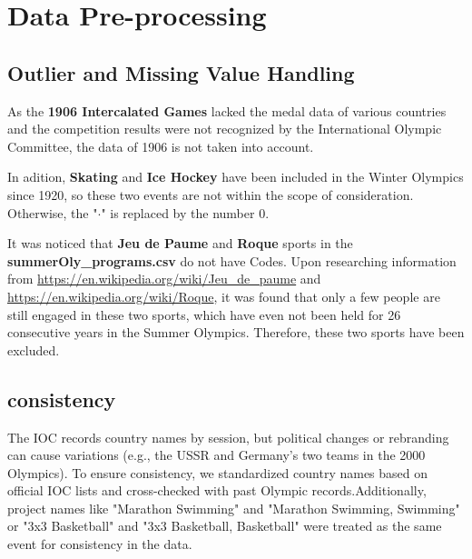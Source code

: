\documentclass{mcmthesis}
\begin{document}
\section{Data Pre-processing}

\subsection{Outlier and Missing Value Handling}
As the \textbf{1906 Intercalated Games} lacked the medal data of various countries and the competition results were not recognized by the International Olympic Committee, the data of 1906 is not taken into account.

In adition, \textbf{Skating} and \textbf{Ice Hockey} have been included in the Winter Olympics since 1920, so these two events are not within the scope of consideration. Otherwise, the "$\cdot$" is replaced by the number $0$. 

It was noticed that \textbf{Jeu de Paume} and \textbf{Roque} sports in the {\bf summerOly\_programs.csv} do not have Codes. Upon researching information from {\color{blue}\url{https://en.wikipedia.org/wiki/Jeu_de_paume}} and {\color{blue}\url{https://en.wikipedia.org/wiki/Roque}}, it was found that only a few people are still engaged in these two sports, which have even not been held for 26 consecutive years in the Summer Olympics. Therefore, these two sports have been excluded.

\subsection{consistency}
The IOC records country names by session, but political changes or rebranding can cause variations (e.g., the USSR and Germany's two teams in the 2000 Olympics). To ensure consistency, we standardized country names based on official IOC lists and cross-checked with past Olympic records.Additionally, project names like "Marathon Swimming" and "Marathon Swimming, Swimming" or "3x3 Basketball" and "3x3 Basketball, Basketball" were treated as the same event for consistency in the data.



	
	
	
	
	
	
	
	
	
	
	
	
	
	
	\newpage
\end{document}
